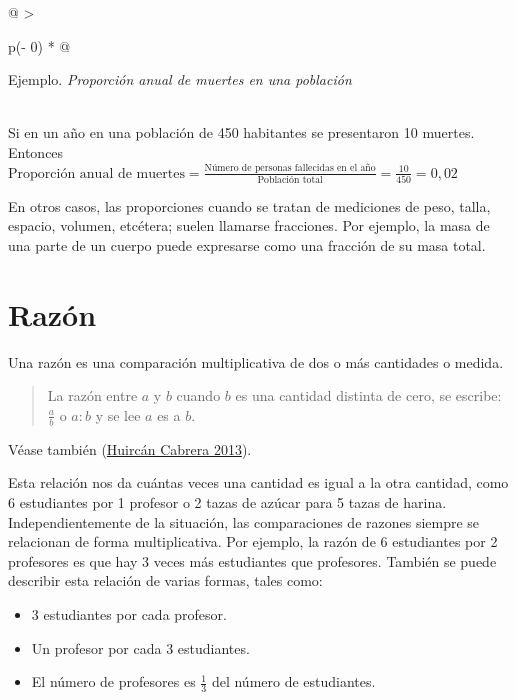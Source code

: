 \documentclass[
  11pt,
]{book}
\providecommand{\tightlist}{%
  \setlength{\itemsep}{0pt}\setlength{\parskip}{0pt}}
\begin{document}
\begin{longtable}[]{@{}
  >{\raggedright\arraybackslash}p{(\columnwidth - 0\tabcolsep) * }@{}}
\toprule
\begin{minipage}[b]{\linewidth}\raggedright
Ejemplo. \emph{Proporción anual de muertes en una población}
\end{minipage} \\
\midrule
\endhead
Si en un año en una población de 450 habitantes se presentaron 10 muertes. Entonces \(\text{Proporción anual de muertes}=\frac{\text{Número de personas fallecidas en el año}}{\text{Población total}}=\frac{10}{450}=0,02\) \\
\bottomrule
\end{longtable}

En otros casos, las proporciones cuando se tratan de mediciones de peso, talla, espacio, volumen, etcétera; suelen llamarse fracciones. Por ejemplo, la masa de una parte de un cuerpo puede expresarse como una fracción de su masa total.

\hypertarget{razuxf3n}{%
\chapter{Razón}\label{razuxf3n}}

Una razón es una comparación multiplicativa de dos o más cantidades o medida.

\begin{quote}
La razón entre \(a\) y \(b\) cuando \(b\) es una cantidad distinta de cero, se escribe:
\(\frac{a}{b}\) o \(a:b\) y se lee \(a\) es a \(b\).
\end{quote}

Véase también (\protect\hyperlink{ref-huircan2013guia}{Huircán Cabrera 2013}).

Esta relación nos da cuántas veces una cantidad es igual a la otra cantidad, como 6 estudiantes por 1 profesor o 2 tazas de azúcar para 5 tazas de harina. Independientemente de la situación, las comparaciones de razones siempre se relacionan de forma multiplicativa. Por ejemplo, la razón de 6 estudiantes por 2 profesores es que hay 3 veces más estudiantes que profesores. También se puede describir esta relación de varias formas, tales como:

\begin{itemize}
\tightlist
\item
  3 estudiantes por cada profesor.
\item
  Un profesor por cada 3 estudiantes.
\item
  El número de profesores es \(\frac{1}{3}\) del número de estudiantes.
\end{itemize}
\end{document}
